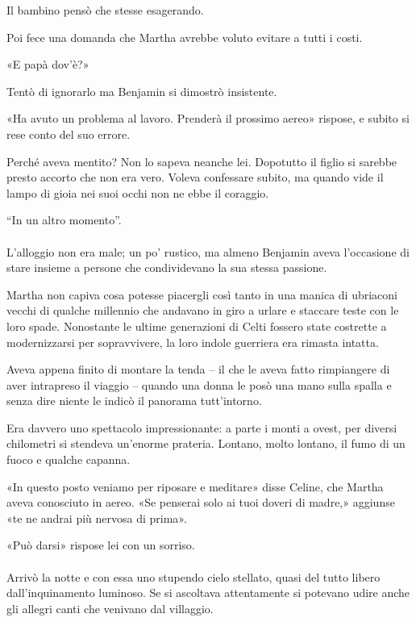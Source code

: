 \documentclass[a4paper,12pt]{book}
\begin{document}
Il bambino pensò che stesse esagerando.

Poi fece una domanda che Martha avrebbe voluto evitare a tutti i costi.

«E papà dov'è?»

Tentò di ignorarlo ma Benjamin si dimostrò insistente.

«Ha avuto un problema al lavoro. Prenderà il prossimo aereo» rispose, e
subito si rese conto del suo errore.

Perché aveva mentito? Non lo sapeva neanche lei. Dopotutto il figlio si sarebbe
presto accorto che non era vero. Voleva confessare subito, ma quando vide il
lampo di gioia nei suoi occhi non ne ebbe il coraggio.

``In un altro momento''.
\paragraph{}
L’alloggio non era male; un po' rustico, ma almeno Benjamin aveva l'occasione
di stare insieme a persone che condividevano la sua stessa passione.

Martha non capiva cosa potesse piacergli così tanto in una manica di ubriaconi
vecchi di qualche millennio che andavano in giro a urlare e staccare teste con
le loro spade. Nonostante le ultime generazioni di Celti fossero state costrette
a modernizzarsi per sopravvivere, la loro indole guerriera era rimasta intatta.

Aveva appena finito di montare la tenda -- il che le aveva fatto rimpiangere di
aver intrapreso il viaggio -- quando una donna le posò una mano sulla spalla e
senza dire niente le indicò il panorama tutt'intorno.

Era davvero uno spettacolo impressionante: a parte i monti a ovest, per diversi
chilometri si stendeva un'enorme prateria. Lontano, molto lontano, il fumo di un
fuoco e qualche capanna.

«In questo posto veniamo per riposare e meditare» disse Celine, che Martha
aveva conosciuto in aereo. «Se penserai solo ai tuoi doveri di madre,»
aggiunse «te ne andrai più nervosa di prima».

«Può darsi» rispose lei con un sorriso.

\paragraph{}
Arrivò la notte e con essa uno stupendo cielo stellato, quasi del tutto libero
dall'inquinamento luminoso. Se si ascoltava attentamente si potevano udire anche
gli allegri canti che venivano dal villaggio.
\end{document}
